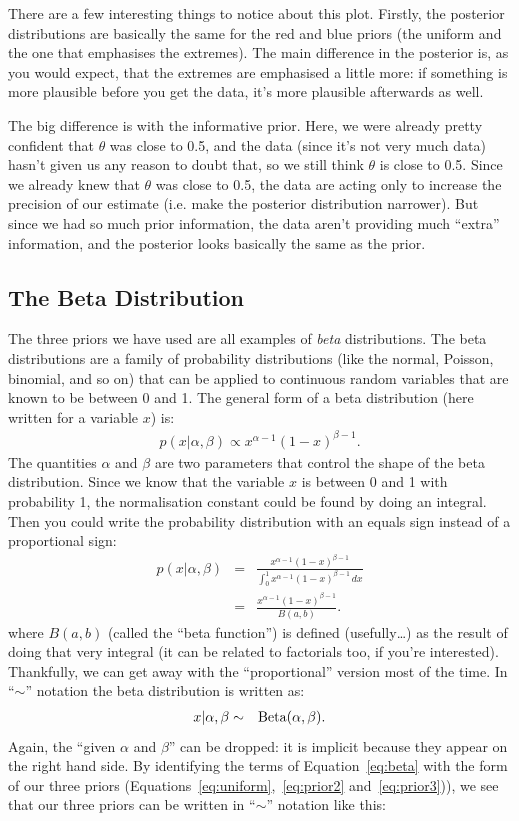 There are a few interesting things to notice about this plot. Firstly, the
posterior distributions are basically the same for the red and blue priors (the
uniform and the one that emphasises the extremes). The main difference in the
posterior is, as you would expect, that the extremes are emphasised a little
more: if something is more plausible before you get the data, it's more
plausible afterwards as well.

The big difference is with the informative prior. Here, we were already pretty
confident that $\theta$ was close to 0.5, and the data (since it's not very
much data) hasn't given us any reason to doubt that, so we still think $\theta$
is close to 0.5. Since we already knew that $\theta$ was close to 0.5, the data
are acting only to increase the precision of our estimate (i.e. make the
posterior distribution narrower). But since we had so much prior information,
the data aren't providing much ``extra'' information, and the posterior looks
basically the same as the prior.

\subsection{The Beta Distribution}
The three priors we have used are all examples of {\it beta} distributions. The beta
distributions are a family of probability distributions (like the normal, Poisson,
binomial, and so on) that can be applied to continuous random variables that are known
to be between 0 and 1. The general form of a beta distribution (here written
for a variable $x$) is:
\begin{eqnarray}
p(x|\alpha, \beta) \propto x^{\alpha - 1}(1 - x)^{\beta - 1}\label{eq:beta}.
\end{eqnarray}
The quantities $\alpha$ and $\beta$ are two parameters that control the shape
of the beta distribution. Since we know that the variable $x$ is between 0 and 1 with probability 1, the
normalisation constant could be found by doing an integral. Then you could write
the probability distribution with an equals sign instead of a proportional sign:
\begin{eqnarray}
p(x|\alpha, \beta) &=& \frac{x^{\alpha - 1}(1 - x)^{\beta - 1}}
{\int_0^1 x^{\alpha - 1}(1 - x)^{\beta - 1} \, dx}\\
&=& \frac{x^{\alpha - 1}(1 - x)^{\beta - 1}}
{B(a, b)}.
\end{eqnarray}
where $B(a, b)$ (called the ``beta function'') is defined (usefully\ldots) as the
result of doing that very integral (it can be related to factorials too, if you're interested).
Thankfully, we can get away with the ``proportional'' version most of the time.
In ``$\sim$'' notation the beta distribution is written as:
\begin{eqnarray}
x|\alpha, \beta &\sim& \textnormal{Beta}(\alpha, \beta).
\end{eqnarray}
Again, the ``given $\alpha$ and $\beta$'' can be dropped: it is implicit because
they appear on the right hand side. By identifying the terms of
Equation~\ref{eq:beta} with the form of our three priors (Equations~\ref{eq:uniform},~\ref{eq:prior2} and~\ref{eq:prior3})),
we see that our three priors can be written in ``$\sim$'' notation like this:

